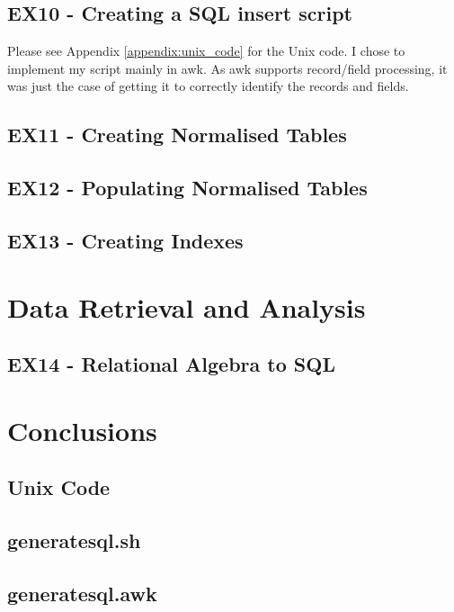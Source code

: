 \documentclass[a4paper]{article}
\begin{document}
\subsection{EX10 - Creating a SQL insert script}
Please see Appendix \ref{appendix:unix_code} for the Unix code.
I chose to implement my script mainly in awk.
As awk supports record/field processing, it was just the case of getting it to correctly identify the records and fields.
\subsection{EX11 - Creating Normalised Tables}
\subsection{EX12 - Populating Normalised Tables}
\subsection{EX13 - Creating Indexes}

\section{Data Retrieval and Analysis}
\subsection{EX14 - Relational Algebra to SQL}

\section{Conclusions}

\begin{appendices}
\section{Unix Code}
\label{unix_code}
\subsection{generatesql.sh}

\subsection{generatesql.awk}

\end{appendices}
\end{document}
